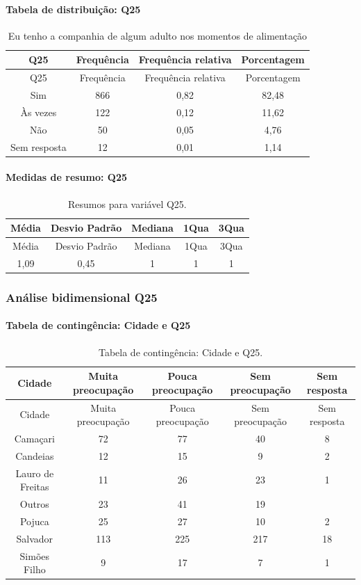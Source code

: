 \documentclass[]{article}
\let\oldparagraph\paragraph
\renewcommand{\paragraph}[1]{\oldparagraph{#1}\mbox{}}
\begin{document}
\hypertarget{tabela-de-distribuiuxe7uxe3o-q25}{%
\paragraph{Tabela de distribuição: Q25}\label{tabela-de-distribuiuxe7uxe3o-q25}}

\begin{longtable}[]{@{}cccc@{}}
\caption{\label{tab:unnamed-chunk-660}Eu tenho a companhia de algum adulto nos momentos de alimentação}\tabularnewline
\toprule
Q25 & Frequência & Frequência relativa & Porcentagem\tabularnewline
\midrule
\endfirsthead
\toprule
Q25 & Frequência & Frequência relativa & Porcentagem\tabularnewline
\midrule
\endhead
Sim & 866 & 0,82 & 82,48\tabularnewline
Às vezes & 122 & 0,12 & 11,62\tabularnewline
Não & 50 & 0,05 & 4,76\tabularnewline
Sem resposta & 12 & 0,01 & 1,14\tabularnewline
\bottomrule
\end{longtable}

\hypertarget{medidas-de-resumo-q25}{%
\paragraph{Medidas de resumo: Q25}\label{medidas-de-resumo-q25}}

\begin{longtable}[]{@{}ccccc@{}}
\caption{\label{tab:unnamed-chunk-661}Resumos para variável Q25.}\tabularnewline
\toprule
Média & Desvio Padrão & Mediana & 1Qua & 3Qua\tabularnewline
\midrule
\endfirsthead
\toprule
Média & Desvio Padrão & Mediana & 1Qua & 3Qua\tabularnewline
\midrule
\endhead
1,09 & 0,45 & 1 & 1 & 1\tabularnewline
\bottomrule
\end{longtable}

\cleardoublepage

\hypertarget{anuxe1lise-bidimensional-q25}{%
\subsubsection{Análise bidimensional Q25}\label{anuxe1lise-bidimensional-q25}}

\hypertarget{tabela-de-continguxeancia-cidade-e-q25}{%
\paragraph{Tabela de contingência: Cidade e Q25}\label{tabela-de-continguxeancia-cidade-e-q25}}

\begin{longtable}[]{@{}ccccc@{}}
\caption{\label{tab:unnamed-chunk-662}Tabela de contingência: Cidade e Q25.}\tabularnewline
\toprule
Cidade & Muita preocupação & Pouca preocupação & Sem preocupação & Sem resposta\tabularnewline
\midrule
\endfirsthead
\toprule
Cidade & Muita preocupação & Pouca preocupação & Sem preocupação & Sem resposta\tabularnewline
\midrule
\endhead
Camaçari & 72 & 77 & 40 & 8\tabularnewline
Candeias & 12 & 15 & 9 & 2\tabularnewline
Lauro de Freitas & 11 & 26 & 23 & 1\tabularnewline
Outros & 23 & 41 & 19 &\tabularnewline
Pojuca & 25 & 27 & 10 & 2\tabularnewline
Salvador & 113 & 225 & 217 & 18\tabularnewline
Simões Filho & 9 & 17 & 7 & 1\tabularnewline
\bottomrule
\end{longtable}
\end{document}
